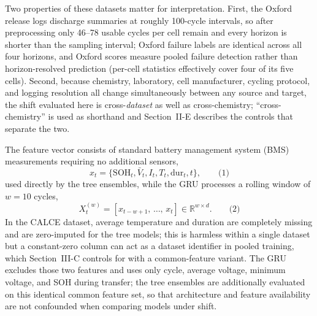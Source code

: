 \documentclass[conference]{IEEEtran}
\begin{document}
Two properties of these datasets matter for interpretation. First, the
Oxford release logs discharge summaries at roughly 100-cycle intervals,
so after preprocessing only 46--78 usable cycles per cell remain and
every horizon is shorter than the sampling interval; Oxford failure
labels are identical across all four horizons, and Oxford scores measure
pooled failure detection rather than horizon-resolved prediction
(per-cell statistics effectively cover four of its five cells). Second, because
chemistry, laboratory, cell manufacturer, cycling protocol, and logging
resolution all change simultaneously between any source and target, the
shift evaluated here is cross-\emph{dataset} as well as
cross-chemistry; ``cross-chemistry'' is used as shorthand and
Section~II-E describes the controls that separate the two.

The feature vector consists of standard battery management system (BMS)
measurements requiring no additional sensors,
\begin{equation}
x_t = \{\mathrm{SOH}_t, \bar{V}_t, I_t, T_t, \mathrm{dur}_t, t\},
\qquad \text{(1)}
\end{equation}
used directly by the tree ensembles, while the GRU processes a rolling
window of $w=10$ cycles,
\begin{equation}
X_t^{(w)} = \left[x_{t-w+1},\, \ldots,\, x_t\right] \in \mathbb{R}^{w \times d}.
\qquad \text{(2)}
\end{equation} In the CALCE dataset, average temperature and
duration are completely missing and are zero-imputed for the tree
models; this is harmless within a single dataset but a constant-zero
column can act as a dataset identifier in pooled training, which
Section~III-C controls for with a common-feature variant. The GRU
excludes those two features and uses only cycle, average voltage,
minimum voltage, and SOH during transfer; the tree ensembles are
additionally evaluated on this identical common feature set, so that
architecture and feature availability are not confounded when
comparing models under shift.
\end{document}
